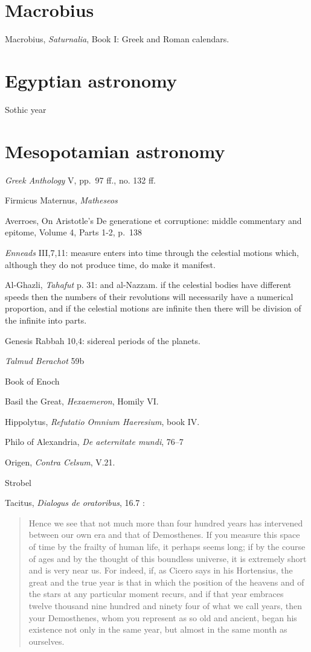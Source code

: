 \documentclass{article}
\begin{document}
\section{Macrobius}
Macrobius, {\em Saturnalia}, Book I: Greek and Roman calendars.




\section{Egyptian astronomy}
Sothic year



\section{Mesopotamian astronomy}


{\em Greek Anthology} V, pp.~97 ff., no. 132 ff.

Firmicus Maternus, {\em Matheseos} \cite{firmicus}

Averroes, On Aristotle's De generatione et corruptione: middle commentary and epitome, Volume 4, Parts 1-2, p.~138

{\em Enneads} III,7,11: measure enters into time through the celestial motions which, although they do not produce time, do make it manifest.


Al-Ghazli, {\em Tahafut} p. 31: and al-Nazzam. if the celestial bodies have different speeds then the numbers of their revolutions will necessarily have a numerical proportion,
and if the celestial motions are infinite then there will be division of the infinite into parts.

Genesis Rabbah 10,4: sidereal periods of the planets. 

{\em Talmud  Berachot} 59b

Book of Enoch

Basil the Great, {\em Hexaemeron}, Homily VI.

Hippolytus, {\em Refutatio Omnium Haeresium}, book IV.

Philo of Alexandria, {\em De aeternitate mundi}, 76--7

Origen, {\em Contra Celsum}, V.21.

Strobel \cite{strobel}

Tacitus, {\em Dialogus de oratoribus}, 16.7 \cite{tacitus}:

\begin{quote}
Hence we see that not much more than four hundred years has intervened between our own era and that of Demosthenes. If you measure this space of time by the frailty of human life, it perhaps seems long; if by the course of ages and by the thought of this boundless universe, it is extremely short and is very near us. For indeed, if, as Cicero says in his Hortensius, the great and the true year is that in which the position of the heavens and of the stars at any particular moment recurs, and if that year embraces twelve thousand nine hundred and ninety four of what we call years, then your Demosthenes, whom you represent as so old and ancient, began his existence not only in the same year, but almost in the same month as ourselves.
\end{quote}
\end{document}
